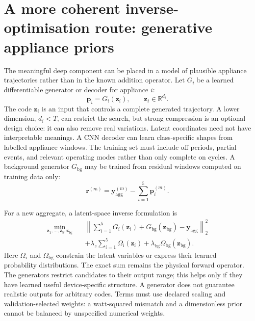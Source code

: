 \documentclass[11pt]{article}
\newcommand{\R}{\mathbb{R}}
\newcommand{\vect}[1]{\mathbf{#1}}
\begin{document}
\section{A more coherent inverse-optimisation route: generative appliance priors}

The meaningful deep component can be placed in a model of plausible appliance trajectories rather than in the known addition operator. Let $G_i$ be a learned differentiable generator or decoder for appliance $i$:
\begin{equation}
    \vect{p}_i=G_i(\vect{z}_i),\qquad \vect{z}_i\in\R^{d_i}.
    \label{eq:appliance_generator}
\end{equation}
The code $\vect{z}_i$ is an input that controls a complete generated trajectory. A lower dimension, $d_i<T$, can restrict the search, but strong compression is an optional design choice: it can also remove real variations. Latent coordinates need not have interpretable meanings. A CNN decoder can learn class-specific shapes from labelled appliance windows. The training set must include off periods, partial events, and relevant operating modes rather than only complete on cycles. A background generator $G_{\mathrm{bg}}$ may be trained from residual windows computed on training data only:
\begin{equation}
    \vect{r}^{(m)}=\vect{y}_{\mathrm{agg}}^{(m)}-
    \sum_{i=1}^{5}\vect{p}_i^{(m)}.
    \label{eq:training_residual}
\end{equation}

For a new aggregate, a latent-space inverse formulation is
\begin{equation}
\begin{split}
    \min_{\vect{z}_1,\ldots,\vect{z}_5,\vect{z}_{\mathrm{bg}}}\quad &
    \left\|
    \sum_{i=1}^{5}G_i(\vect{z}_i)+
    G_{\mathrm{bg}}(\vect{z}_{\mathrm{bg}})-
    \vect{y}_{\mathrm{agg}}
    \right\|_2^2\\
    &+\lambda_z\sum_{i=1}^{5}\Omega_i(\vect{z}_i)
    +\lambda_{\mathrm{bg}}\Omega_{\mathrm{bg}}(\vect{z}_{\mathrm{bg}}).
    \label{eq:latent_inverse}
\end{split}
\end{equation}
Here $\Omega_i$ and $\Omega_{\mathrm{bg}}$ constrain the latent variables or express their learned probability distributions. The exact sum remains the physical forward operator. The generators restrict candidates to their output range; this helps only if they have learned useful device-specific structure. A generator does not guarantee realistic outputs for arbitrary codes. Terms must use declared scaling and validation-selected weights: a watt-squared mismatch and a dimensionless prior cannot be balanced by unspecified numerical weights.
\end{document}
